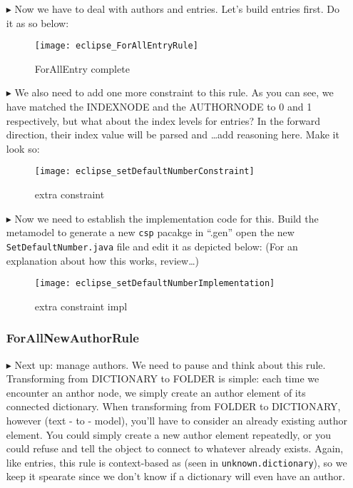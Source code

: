 \begin{itemize}
\item[$\blacktriangleright$] Now we have to deal with authors and entries. Let's build entries first. Do it as so below:

\begin{figure}[htbp]
\begin{center}
  \texttt{[image: eclipse\_ForAllEntryRule]}
  \caption{ForAllEntry complete}
  \label{eclipse:NodeToDictionaryRule}
\end{center}
\end{figure}

\item[$\blacktriangleright$] We also need to add one more constraint to this rule. As you can see, we have matched the INDEXNODE and the AUTHORNODE to 0 and 1
respectively, but what about the index levels for entries? In the forward direction, their index value will be parsed and \ldots add reasoning here. Make it
look so:

\begin{figure}[htbp]
\begin{center}
  \texttt{[image: eclipse\_setDefaultNumberConstraint]}
  \caption{extra constraint}
  \label{eclipse:newEntryConstraint}
\end{center}
\end{figure}

\item[$\blacktriangleright$] Now we need to establish the implementation code for this. Build the metamodel to generate a new \texttt{csp} pacakge in ``.gen''
open the new \texttt{SetDefaultNumber.java} file and edit it as depicted below: (For an explanation about how this works, review\ldots)

\begin{figure}[htbp]
\begin{center}
  \texttt{[image: eclipse\_setDefaultNumberImplementation]}
  \caption{extra constraint impl}
  \label{eclipse:setDefaultImpl}
\end{center}
\end{figure}


\subsubsection{ForAllNewAuthorRule} %

\item[$\blacktriangleright$] Next up: manage authors. We need to pause and think about this rule. Transforming from DICTIONARY to FOLDER is simple: each time
we encounter an anthor node, we simply create an author element of its connected dictionary. When transforming from FOLDER to DICTIONARY, however (text - to -
model), you'll have to consider an already existing author element. You could simply create a new author element repeatedly, or you could refuse and tell
the object to connect to whatever already exists. Again, like entries, this rule is context-based as (seen in \texttt{unknown.dictionary}), so we keep it
spearate since we don't know if a dictionary will even have an author.


\end{itemize}
